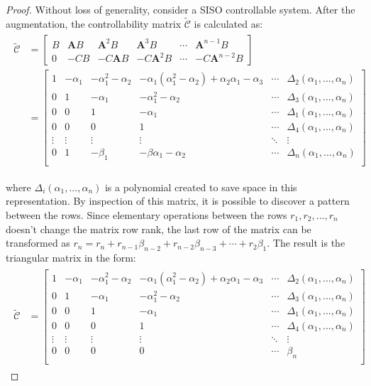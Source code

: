 \documentclass[a4paper,11pt]{book}
\numberwithin{figure}{chapter}
\numberwithin{equation}{chapter}
\numberwithin{table}{chapter}
\theoremstyle{definition}
\begin{document}
\begin{proof}
	Without loss of generality, consider a SISO controllable system. After the augmentation, the controllability matrix $\tilde{\bm{\mathcal{C}}}$ is calculated as:
	\begin{align}
	\begin{split}
		\tilde{\bm{\mathcal{C}}} &= \begin{bmatrix}
			B & \bm{A} B & \bm{A}^2 B & \bm{A}^3 B & \cdots & \bm{A}^{n-1} B \\
			0 & -C B & -C \bm{A} B & -C \bm{A}^2 B & \cdots & -C \bm{A}^{n-2} B
		\end{bmatrix} \\
		&=
			\begin{bmatrix}
				1 & -\alpha_1 & -\alpha_1^2 - \alpha_2 & -\alpha_1(\alpha_1^2 - \alpha_2) + \alpha_2 \alpha_1 - \alpha_3 & \cdots & \Delta_2(\alpha_1,...,\alpha_n) \\
				0 & 1 & -\alpha_1 & -\alpha_1^2 - \alpha_2  & \cdots & \Delta_3(\alpha_1,...,\alpha_n) \\
				0 & 0 & 1 & -\alpha_1  & \cdots & \Delta_1(\alpha_1,...,\alpha_n) \\
				0 & 0 & 0 & 1 &  \cdots & \Delta_4(\alpha_1,...,\alpha_n) \\
				\vdots & \vdots & \vdots & \vdots & \ddots & \vdots \\
				0 & 1 & -\beta_1 & -\beta\alpha_1 - \alpha_2  & \cdots & \Delta_n(\alpha_1,...,\alpha_n) \\
			\end{bmatrix}
	\end{split}
	\end{align}
	
	\noindent where $\Delta_i(\alpha_1,...,\alpha_n)$ is a polynomial created to save space in this representation. By inspection of this matrix, it is possible to discover a pattern between the rows. Since elementary operations between the rows ${r_1, r_2, ..., r_n}$ doesn't change the matrix row rank, the last row of the matrix can be transformed as $r_n = r_n + r_{n-1}\beta_{n-2} + r_{n-2}\beta_{n-3} + \cdots + r_{2}\beta_{1}$. The result is the triangular matrix in the form:
	\begin{align}
	\begin{split}
		\tilde{\bm{\mathcal{C}}} &= 
			\begin{bmatrix}
				1 & -\alpha_1 & -\alpha_1^2 - \alpha_2 & -\alpha_1(\alpha_1^2 - \alpha_2) + \alpha_2 \alpha_1 - \alpha_3 & \cdots & \Delta_2(\alpha_1,...,\alpha_n) \\
				0 & 1 & -\alpha_1 & -\alpha_1^2 - \alpha_2  & \cdots & \Delta_3(\alpha_1,...,\alpha_n) \\
				0 & 0 & 1 & -\alpha_1  & \cdots & \Delta_1(\alpha_1,...,\alpha_n) \\
				0 & 0 & 0 & 1 &  \cdots & \Delta_4(\alpha_1,...,\alpha_n) \\
				\vdots & \vdots & \vdots & \vdots & \ddots & \vdots \\
				0 & 0 & 0 & 0  & \cdots & \beta_n \\
			\end{bmatrix}
	\end{split}
	\end{align}
	

\end{proof}
\end{document}
